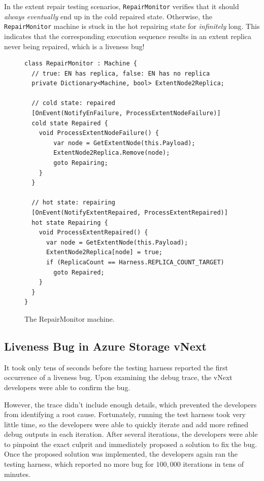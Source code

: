 
In the extent repair testing scenarios, \texttt{RepairMonitor} verifies that it should {\em always eventually} end up in the cold repaired state. Otherwise, the \texttt{RepairMonitor} machine is stuck in the hot repairing state for {\em infinitely} long. This indicates that the corresponding execution sequence results in an extent replica never being repaired, which is a liveness bug!

\begin{figure}[t]
\begin{lstlisting}
class RepairMonitor : Machine {
  // true: EN has replica, false: EN has no replica
  private Dictionary<Machine, bool> ExtentNode2Replica;

  // cold state: repaired
  [OnEvent(NotifyEnFailure, ProcessExtentNodeFailure)]
  cold state Repaired {
    void ProcessExtentNodeFailure() {
        var node = GetExtentNode(this.Payload);
        ExtentNode2Replica.Remove(node);
        goto Repairing;
    }
  }

  // hot state: repairing
  [OnEvent(NotifyExtentRepaired, ProcessExtentRepaired)]
  hot state Repairing {
    void ProcessExtentRepaired() {
      var node = GetExtentNode(this.Payload);
      ExtentNode2Replica[node] = true;
      if (ReplicaCount == Harness.REPLICA_COUNT_TARGET)
        goto Repaired;
    }
  }
}
\end{lstlisting}
\vspace{-2mm}
\caption{The RepairMonitor machine.}
\label{fig:monitor}
\end{figure}

\subsection{Liveness Bug in Azure Storage vNext}
\label{sec:method:azurestore}

It took only tens of seconds before the testing harness reported the first occurrence of a liveness bug. Upon examining the debug trace, the vNext developers were able to confirm the bug.

However, the trace didn't include enough details, which prevented the developers from identifying a root cause. Fortunately, running the test harness took very little time, so the developers were able to quickly iterate and add more refined debug outputs in each iteration. After several iterations, the developers were able to pinpoint the exact culprit and immediately proposed a solution to fix the bug. Once the proposed solution was implemented, the developers again ran the testing harness, which reported no more bug for $100,000$ iterations in tens of minutes.

